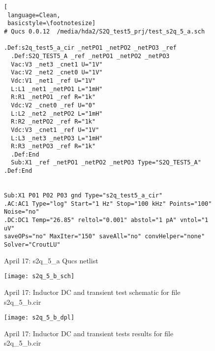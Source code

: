\begin{figure}
\begin{lstlisting}[
 language=Clean, 
 basicstyle=\footnotesize]
# Qucs 0.0.12  /media/hda2/S2Q_test5_prj/test_s2q_5_a.sch

.Def:s2q_test5_a_cir _netPO1 _netPO2 _netPO3 _ref
  .Def:S2Q_TEST5_A _ref _netPO1 _netPO2 _netPO3
  Vac:V3 _net3 _cnet1 U="1V"
  Vac:V2 _net2 _cnet0 U="1V"
  Vdc:V1 _net1 _ref U="1V"
  L:L1 _net1 _netPO1 L="1mH"
  R:R1 _netPO1 _ref R="1k"
  Vdc:V2 _cnet0 _ref U="0"
  L:L2 _net2 _netPO2 L="1mH"
  R:R2 _netPO2 _ref R="1k"
  Vdc:V3 _cnet1 _ref U="1V"
  L:L3 _net3 _netPO3 L="1mH"
  R:R3 _netPO3 _ref R="1k"
  .Def:End
  Sub:X1 _ref _netPO1 _netPO2 _netPO3 Type="S2Q_TEST5_A"
.Def:End


Sub:X1 P01 P02 P03 gnd Type="s2q_test5_a_cir"
.AC:AC1 Type="log" Start="1 Hz" Stop="100 kHz" Points="100" Noise="no"
.DC:DC1 Temp="26.85" reltol="0.001" abstol="1 pA" vntol="1 uV" 
saveOPs="no" MaxIter="150" saveAll="no" convHelper="none" Solver="CroutLU"

\end{lstlisting}
 \caption{April 17: s2q\_5\_a Qucs netlist}
  \label{fig:s2q_5_a_qucs}
\end{figure} 




\begin{figure}
  \centering
  \texttt{[image: s2q\_5\_b\_sch]} 
  \caption{April 17: Inductor DC and transient test schematic for file s2q\_5\_b.cir}
  \label{fig:s2q_5_b_sch}
\end{figure} 

\begin{figure}
  \centering
  \texttt{[image: s2q\_5\_b\_dpl]} 
  \caption{April 17: Inductor DC and transient tests results for file s2q\_5\_b.cir}
  \label{fig:s2q_5_b_dpl}
\end{figure} 

